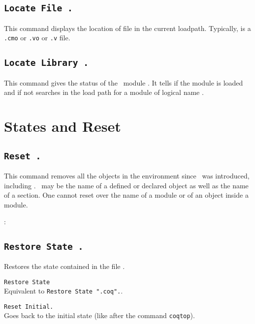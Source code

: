 \subsection{\tt Locate File {\str}.}\label{Locate File}
This command displays the location of file {\str} in the current loadpath.
Typically, {\str} is a \texttt{.cmo} or \texttt{.vo} or \texttt{.v} file.

\subsection{\tt Locate Library {\dirpath}.}
This command gives the status of the \Coq\ module {\dirpath}. It tells if the
module is loaded and if not searches in the load path for a module
of logical name {\dirpath}.

\section{States and Reset}

\subsection{\tt Reset \ident.}
This command removes all the objects in the environment since \ident\ 
was introduced, including \ident. \ident\ may be the name of a defined
or declared object as well as the name of a section.  One cannot reset
over the name of a module or of an object inside a module.

\begin{ErrMsgs}
\item \ident: 
\end{ErrMsgs}

\subsection{\tt Restore State \ident.}
  Restores the state contained in the file \str.

\begin{Variants}
\item {\tt Restore State \ident}\\
 Equivalent to {\tt Restore State "}{\ident}{\tt .coq".}.
\item {\tt Reset Initial.}\\ 
  Goes back to the
  initial state (like after the command {\tt coqtop}).
\end{Variants}

